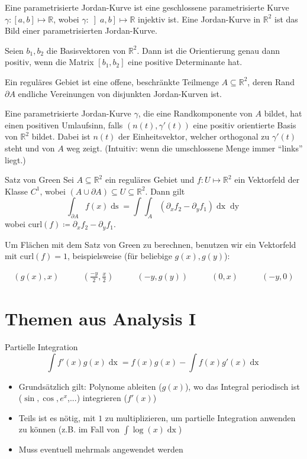 \documentclass[a4paper,10pt]{article}
\def\R{\mathbb{R}}
\def\dx{\mathop{dx}}
\def\dy{\mathop{dy}}
\begin{document}
Eine parametrisierte Jordan-Kurve ist eine geschlossene parametrisierte Kurve \(\gamma : \left[a,b\right] \mapsto \R\), wobei \(\gamma : \left] a,b \right] \mapsto \R\) injektiv ist. Eine Jordan-Kurve in \(\R^2\) ist das Bild einer parametrisierten Jordan-Kurve.

Seien \(b_1, b_2\) die Basisvektoren von \(\R^2\). Dann ist die Orientierung genau dann positiv, wenn die Matrix \(\left[b_1, b_2\right]\) eine positive Determinante hat.

Ein reguläres Gebiet ist eine offene, beschränkte Teilmenge \(A\subseteq \R^2\), deren Rand \(\partial A\) endliche Vereinungen von disjunkten Jordan-Kurven ist.

Eine parametrisierte Jordan-Kurve \(\gamma\), die eine Randkomponente von \(A\) bildet, hat einen positiven Umlaufsinn, falls \((n(t), \gamma'(t))\) eine positiv orientierte Basis von \(\R^2\) bildet. Dabei ist \(n(t)\) der Einheitsvektor, welcher orthogonal zu \(\gamma'(t)\) steht und von \(A\) weg zeigt. (Intuitiv: wenn die umschlossene Menge immer ``links'' liegt.)

\begin{mainbox}{Satz von Green}
  Sei \(A \subseteq \R^2\) ein reguläres Gebiet und \(f: U \mapsto \R^2\) ein Vektorfeld der Klasse \(C^1\), wobei \((A \cup \partial A) \subseteq U \subseteq \R^2\). Dann gilt
  \[\int_{\partial A} f(x) \mathop{ds} = \int \int_A \left(\partial_x f_2 - \partial_y f_1 \right) \dx \dy\]
  wobei $\text{curl}(f) \coloneqq \partial_x f_2 - \partial_y f_1$.
\end{mainbox}
Um Flächen mit dem Satz von Green zu berechnen, benutzen wir ein Vektorfeld mit \(\text{curl}(f) = 1\), beispielsweise (für beliebige $g(x), g(y)$):

\begin{align*}
  (g(x), x) \quad & \quad (\frac{-y}{2}, \frac{x}{2}) \quad & \quad (-y, g(y))\quad  & \quad (0, x) \quad & \quad (-y, 0)
\end{align*}

\section{Themen aus Analysis I}
\begin{mainbox}{Partielle Integration}
 $$\int f'(x) g(x) \dx = f(x)g(x) - \int f(x) g'(x) \dx$$
\end{mainbox}
\begin{itemize}
 \item Grundsätzlich gilt: Polynome ableiten ($g(x)$), wo das Integral periodisch ist ($\sin, \cos, e^x$,...) integrieren ($f'(x)$)
 \item Teils ist es nötig, mit $1$ zu multiplizieren, um partielle Integration anwenden zu können (z.B. im Fall von $\int \log(x) \dx$)
 \item Muss eventuell mehrmals angewendet werden
\end{itemize}
\end{document}
